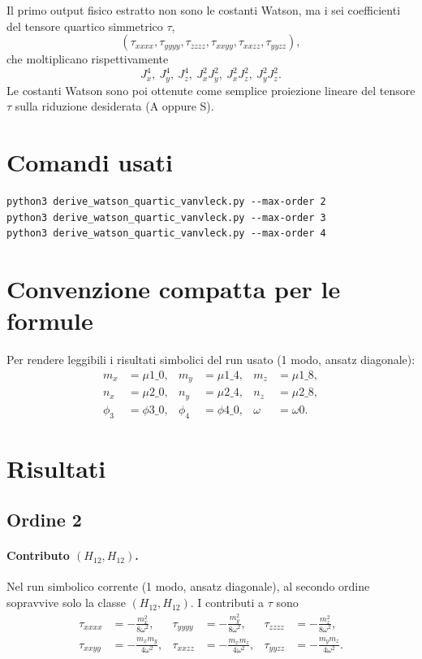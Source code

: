 \documentclass[11pt,a4paper]{article}
\begin{document}
Il primo output fisico estratto non sono le costanti Watson, ma i sei coefficienti del tensore
quartico simmetrico \(\tau\),
\begin{equation}
(\tau_{xxxx},\tau_{yyyy},\tau_{zzzz},\tau_{xxyy},\tau_{xxzz},\tau_{yyzz}),
\end{equation}
che moltiplicano rispettivamente
\begin{equation}
J_x^4,\ J_y^4,\ J_z^4,\ J_x^2J_y^2,\ J_x^2J_z^2,\ J_y^2J_z^2.
\end{equation}
Le costanti Watson sono poi ottenute come semplice proiezione lineare del tensore \(\tau\)
sulla riduzione desiderata (A oppure S).

\section{Comandi usati}
\begin{lstlisting}
python3 derive_watson_quartic_vanvleck.py --max-order 2
python3 derive_watson_quartic_vanvleck.py --max-order 3
python3 derive_watson_quartic_vanvleck.py --max-order 4
\end{lstlisting}

\section{Convenzione compatta per le formule}
Per rendere leggibili i risultati simbolici del run usato (1 modo, ansatz diagonale):
\begin{align}
m_x &= \mu1\_0, & m_y &= \mu1\_4, & m_z &= \mu1\_8,\\
n_x &= \mu2\_0, & n_y &= \mu2\_4, & n_z &= \mu2\_8,\\
\phi_3 &= \phi3\_0, & \phi_4 &= \phi4\_0, & \omega &= \omega0.
\end{align}

\section{Risultati}
\subsection{Ordine 2}
\paragraph{Contributo \((H_{12},H_{12})\).}
Nel run simbolico corrente (1 modo, ansatz diagonale), al secondo ordine sopravvive solo la
classe \((H_{12},H_{12})\). I contributi a \(\tau\) sono
\begin{align}
\tau_{xxxx} &= -\frac{m_x^2}{8\omega^2}, &
\tau_{yyyy} &= -\frac{m_y^2}{8\omega^2}, &
\tau_{zzzz} &= -\frac{m_z^2}{8\omega^2},\\
\tau_{xxyy} &= -\frac{m_xm_y}{4\omega^2}, &
\tau_{xxzz} &= -\frac{m_xm_z}{4\omega^2}, &
\tau_{yyzz} &= -\frac{m_ym_z}{4\omega^2}.
\end{align}
\end{document}
